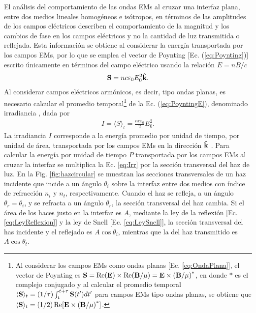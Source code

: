 El análisis del comportamiento de las ondas EMs al cruzar una interfaz plana, entre dos medios lineales homogéneos e isótropos, en términos de las amplitudes de los campos eléctricos describen el comportamiento de la magnitud y los cambios de fase en los campos eléctricos  y no la cantidad de luz transmitida o reflejada. Esta información se obtiene al considerar la energía transportada por los campos EMs, por lo que se emplea el vector de Poynting [Ec. (\ref{eq:Poynting})] escrito únicamente en términos del campo eléctrico usando la relación $E = n B/c$ 
	\begin{align}
	\vb{S} = n c\varepsilon_0 E_0^2 \vu{k}. \label{eq:PoyntingE}
	\end{align}
Al considerar campos eléctricos armónicos, es decir, tipo ondas planas, es necesario calcular el promedio temporal\footnote{Al considerar los campos EMs como ondas planas [Ec. \eqref{eq:OndaPlana}], el vector de Poynting es $\vb{S} = \Re(\vb{E})\times\Re(\vb{B}/\mu) = \vb{E}\times\qty(\vb{B}/\mu)^*$, en donde $*$ es el complejo conjugado y al calcular el promedio temporal $\langle\vb{S}\rangle_t = (1/\tau)\int_t^{t+\tau}\vb{S}(t')dt'$ para campos EMs tipo ondas planas, se obtiene que $\langle\vb{S}\rangle_t = (1/2) \Re[\vb{E}\times\qty(\vb{B}/\mu)^*]$.} de la Ec. (\ref{eq:PoyntingE}), denominado  irradiancia \cite{hecht1998optics}, dada por
	\begin{align}
	I = \langle S \rangle_t = \frac{nc\varepsilon_0}{2} E_0^2.
	\label{eq:Irr}
	\end{align}
La irradiancia $I$ corresponde a la energía promedio por unidad de tiempo, por unidad de área, transportada por los campos EMs en la dirección $\vu{k}$ \cite{griffiths2013electrodynamics}. Para calcular la energía por unidad de tiempo $P$ transportada por los campos EMs al cruzar la interfaz se multiplica la Ec. \eqref{eq:Irr} por la sección transversal del haz de luz. En la Fig. \ref{fig:hazcircular} se muestran las secciones transversales de un haz incidente que incide a un ángulo $\theta_i$ sobre la interfaz entre dos medios con índice de refracción $n_i$ y $n_t$, respectivamente. Cuando el haz se refleja, a un ángulo $\theta_r=\theta_i$, y se refracta a un ángulo $\theta_r$, la sección transversal del haz cambia. Si el área de los haces justo en la interfaz es $A$, mediante la ley de la reflexión [Ec. \eqref{eq:LeyReflexion}] y la ley de Snell [Ec. \eqref{eq:LeySnell}], la sección transversal del has incidente y el reflejado  es $A\cos\theta_i$, mientras que la del haz transmitido es $A\cos\theta_t$.

